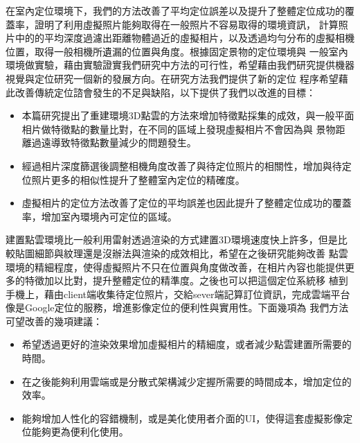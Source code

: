 
	在室內定位環境下，我們的方法改善了平均定位誤差以及提升了整體定位成功的覆蓋率，證明了利用虛擬照片能夠取得在一般照片不容易取得的環境資訊，
計算照片中的的平均深度過濾出距離物體過近的虛擬相片，以及透過均勻分布的虛擬相機位置，取得一般相機所遺漏的位置與角度。根據固定景物的定位環境與
一般室內環境做實驗，藉由實驗證實我們研究中方法的可行性，希望藉由我們研究提供機器視覺與定位研究一個新的發展方向。在研究方法我們提供了新的定位
程序希望藉此改善傳統定位諮會發生的不足與缺陷，以下提供了我們以改進的目標：

\begin{itemize}
	\item 本篇研究提出了重建環境3D點雲的方法來增加特徵點採集的成效，與一般平面相片做特徵點的數量比對，在不同的區域上發現虛擬相片不會因為與
		景物距離過遠導致特徵點數量減少的問題發生。
	\item 經過相片深度篩選後調整相機角度改善了與待定位照片的相關性，增加與待定位照片更多的相似性提升了整體室內定位的精確度。
	\item 虛擬相片的定位方法改善了定位的平均誤差也因此提升了整體定位成功的覆蓋率，增加室內環境內可定位的區域。
\end{itemize}

	建置點雲環境比一般利用雷射透過渲染的方式建置3D環境速度快上許多，但是比較貼圖細節與紋理還是沒辦法與渲染的成效相比，希望在之後研究能夠改善
點雲環境的精細程度，使得虛擬照片不只在位置與角度做改善，在相片內容也能提供更多的特徵加以比對，提升整體定位的精準度。之後也可以把這個定位系統移
植到手機上，藉由client端收集待定位照片，交給sever端記算訂位資訊，完成雲端平台像是Google定位的服務，增進影像定位的便利性與實用性。下面幾項為
我們方法可望改善的幾項建議：

\begin{itemize}
	\item 希望透過更好的渲染效果增加虛擬相片的精細度，或者減少點雲建置所需要的時間。
	\item 在之後能夠利用雲端或是分散式架構減少定握所需要的時間成本，增加定位的效率。
	\item 能夠增加人性化的容錯機制，或是美化使用者介面的UI，使得這套虛擬影像定位能夠更為便利化使用。
\end{itemize}